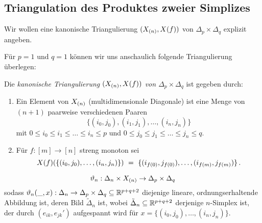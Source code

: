 \subsection{Triangulation des Produktes zweier Simplizes}

Wir wollen eine kanonische Triangulierung $(X_{(n)}, X(f))$ von
$\Delta_p\times \Delta_q$ explizit angeben.

\begin{beispiel}
  Für $p = 1$ und $q=1$ können wir uns anschaulich folgende Triangulierung
  überlegen:
  \begin{center}
  \end{center}
\end{beispiel}


\begin{definition}
  Die \emph{kanonische Triangulierung $(X_{(n)}, X(f))$ von 
  $\Delta_p\times\Delta_q$} ist gegeben durch:
  \begin{enumerate}
    \item Ein Element von $X_{(n)}$ (multidimensionale Diagonale)
      ist eine Menge von $(n+1)$ paarweise verschiedenen Paaren
      \[ \{(i_0,j_0), (i_1,j_1), \ldots, (i_n,j_n)\}\]
      mit $0\leq i_0\leq i_1 \leq\ldots\leq i_n \leq p$
      und $0\leq j_0 \leq j_1 \leq \ldots \leq j_n\leq q$.
    \item Für $f:[m] \to [n]$ streng monoton sei
      \[ X(f)(\{(i_0,j_0), \ldots, (i_n,j_n)\}) \ =\ 
        \{(i_{f(0)}, j_{f(0)}), \ldots, (i_{f(m)}, j_{f(m)})\} \,.\]
  \end{enumerate}
\end{definition}


\begin{definition}
  \[ \vartheta_n: \Delta_n \times X_{(n)} \to \Delta_p\times\Delta_q\]
  sodass $\vartheta_n(\_,x): \Delta_n \to \Delta_p\times\Delta_q \subseteq 
  \mathbb{R}^{p+q+2}$ diejenige lineare, ordnungserhaltende Abbildung ist, deren Bild
  $\tilde\Delta_n$ ist, wobei $\tilde\Delta_n\subseteq\mathbb{R}^{p+q+2}$ derjenige
  $n$-Simplex ist, der durch $(e_{ik},e_{jk}')$ aufgespannt wird für
  $x = \{(i_0,j_0),\ldots,(i_n,j_n)\}$.
\end{definition}


